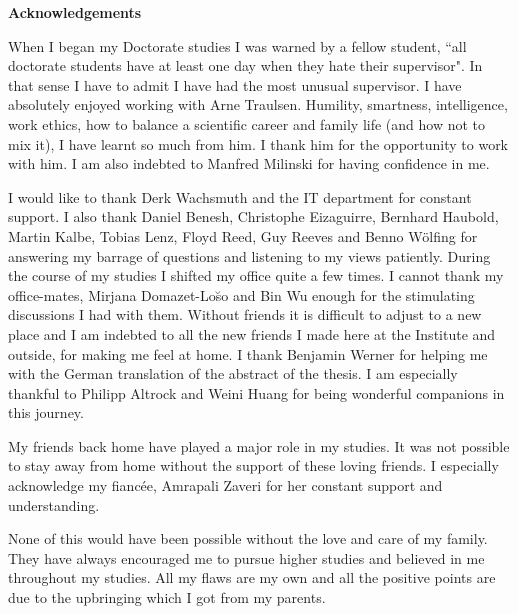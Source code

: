 \documentclass[oneside,11pt,a4paper]{book}
\renewcommand{\baselinestretch}{1.1}
\begin{document}
\setlength\bibsep{1pt}
\footnotesize
\renewcommand{\bibname}{References} %
%
\normalsize
\newpage
\thispagestyle{plain}
\renewcommand{\thepage}{\roman{page}}
\begin{center}
\Large{\textbf{Acknowledgements}}
\end{center}
\small
When I began my Doctorate studies I was warned by a fellow student, ``all doctorate students have at least one day when they hate their supervisor".
In that sense I have to admit I have had the most unusual supervisor.
I have absolutely enjoyed working with Arne Traulsen.
Humility, smartness, intelligence, work ethics, how to balance a scientific career and family life (and how not to mix it), I have learnt so much from him.
I thank him for the opportunity to work with him.
I am also indebted to Manfred Milinski for having confidence in me.

I would like to thank Derk Wachsmuth and the IT department for constant support.
I also thank Daniel Benesh, Christophe Eizaguirre, Bernhard Haubold, Martin Kalbe, Tobias Lenz, Floyd Reed, Guy Reeves and Benno W\"{o}lfing for answering my barrage of questions and listening to my views patiently.
During the course of my studies I shifted my office quite a few times.
I cannot thank my office-mates, Mirjana Domazet-Lo\u{s}o and Bin Wu enough for the stimulating discussions I had with them.
Without friends it is difficult to adjust to a new place and I am indebted to all the new friends I made here at the Institute and outside, for making me feel at home.
I thank Benjamin Werner for helping me with the German translation of the abstract of the thesis.
I am especially thankful to Philipp Altrock and Weini Huang for being wonderful companions in this journey.

My friends back home have played a major role in my studies.
It was not possible to stay away from home without the support of these loving friends.
I especially acknowledge my fianc\'ee, Amrapali Zaveri for her constant support and understanding.

None of this would have been possible without the love and care of my family.
They have always encouraged me to pursue higher studies and believed in me throughout my studies.
All my flaws are my own and all the positive points are due to the upbringing which I got from my parents.
\end{document}
